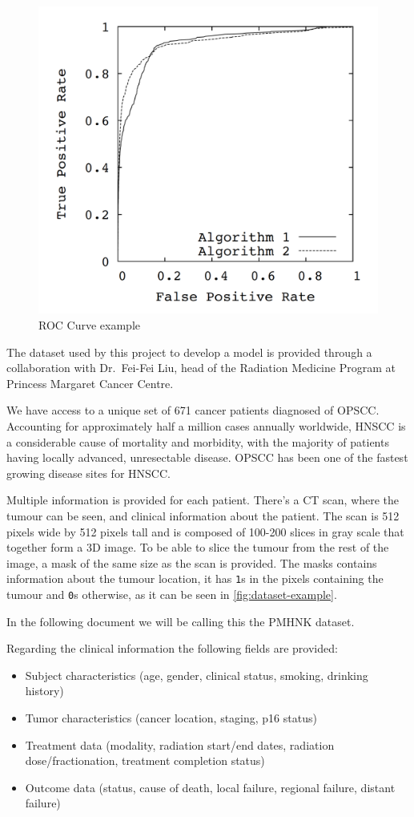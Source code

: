 \begin{figure}
  \centering
  \includegraphics[width=.5\linewidth]{images/roc_curve}
  \caption{\acrshort{ROC} Curve example\label{fig:ROC-curve}}
\end{figure}


The dataset used by this project to develop a model is provided through a 
collaboration with Dr.~Fei-Fei Liu, head of the Radiation Medicine Program at Princess
Margaret Cancer Centre.

We have access to a unique set of 671 cancer patients diagnosed of \gls{OPSCC}. Accounting
for approximately half a million cases annually worldwide, \gls{HNSCC} 
is a considerable cause of mortality and morbidity, with the majority of patients having
locally advanced, unresectable disease. \gls{OPSCC} has been one of the fastest growing 
disease sites for \gls{HNSCC}.
~\cite{medical:ct-based-radiomic-signature}

Multiple information is provided for each patient. There's a \gls{CT} scan, where the tumour 
can be seen, and clinical information about the patient. The scan is 512 pixels wide by 512 
pixels tall and is composed of 100-200 slices in gray scale that together form a 3D image. 
To be able to slice the tumour from the rest of the image, a mask of the same size as the scan 
is provided. The masks contains information about the tumour location, it has \texttt{1}s 
in the pixels containing the tumour and \texttt{0}s
otherwise, as it can be seen in \autoref{fig:dataset-example}.

In the following document we will be calling this the \gls{PMHNK} dataset.

Regarding the clinical information the following fields are provided:
\begin{itemize}
  \item Subject characteristics (age, gender, clinical status, smoking, drinking history)
  \item Tumor characteristics (cancer location, staging, p16 status)
  \item Treatment data (modality, radiation start/end dates, radiation dose/fractionation, 
  treatment completion status)
  \item Outcome data (status, cause of death, local failure, regional failure, distant failure)
\end{itemize}

